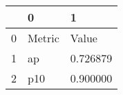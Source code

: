 \begin{tabular}{lll}
\toprule
 & 0 & 1 \\
\midrule
0 & Metric & Value \\
1 & ap & 0.726879 \\
2 & p10 & 0.900000 \\
\bottomrule
\end{tabular}
